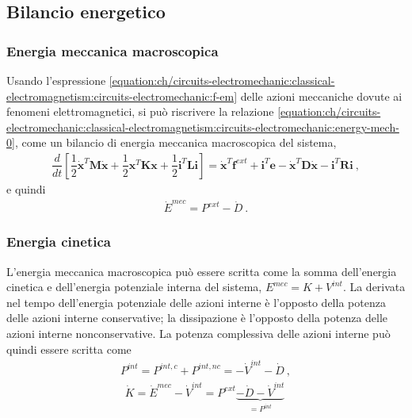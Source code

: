 \documentclass[letterpaper,10pt,english]{jupyterBook}
\begin{document}
\subsection{Bilancio energetico}
\label{\detokenize{ch/circuits-electromechanic:bilancio-energetico}}

\subsubsection{Energia meccanica macroscopica}
\label{\detokenize{ch/circuits-electromechanic:energia-meccanica-macroscopica}}
\sphinxAtStartPar
Usando l’espressione \eqref{equation:ch/circuits-electromechanic:classical-electromagnetism:circuits-electromechanic:f-em} delle azioni meccaniche dovute ai fenomeni elettromagnetici, si può riscrivere la relazione \eqref{equation:ch/circuits-electromechanic:classical-electromagnetism:circuits-electromechanic:energy-mech-0}, come un bilancio di energia meccanica macroscopica del sistema,
\begin{equation*}
\begin{split}\dfrac{d}{dt} \left[ \dfrac{1}{2} \dot{\mathbf{x}}^T \mathbf{M} \dot{\mathbf{x}} + \dfrac{1}{2} \mathbf{x}^T \mathbf{K} \mathbf{x} + \dfrac{1}{2} \mathbf{i}^T \mathbf{L} \mathbf{i} \right] = \dot{\mathbf{x}}^T \mathbf{f}^{ext} + \mathbf{i}^T \mathbf{e} - \dot{\mathbf{x}}^T \mathbf{D} \dot{\mathbf{x}} - \mathbf{i}^T \mathbf{R} \mathbf{i} \ , \end{split}
\end{equation*}
\sphinxAtStartPar
e quindi
\begin{equation*}
\begin{split}\dot{E}^{mec} = P^{ext} - \dot{D} \ .\end{split}
\end{equation*}

\subsubsection{Energia cinetica}
\label{\detokenize{ch/circuits-electromechanic:energia-cinetica}}
\sphinxAtStartPar
L’energia meccanica macroscopica può essere scritta come la somma dell’energia cinetica e dell’energia potenziale interna del sistema, \(E^{mec} = K + V^{int}\). La derivata nel tempo dell’energia potenziale delle azioni interne è l’opposto della potenza delle azioni interne conservative; la dissipazione è l’opposto della potenza delle azioni interne non\sphinxhyphen{}conservative. La potenza complessiva delle azioni interne può quindi essere scritta come
\begin{equation*}
\begin{split}P^{int} = P^{int, c} + P^{int, nc} = - \dot{V}^{int} - \dot{D} \ ,\end{split}
\end{equation*}\begin{equation*}
\begin{split}\dot{K} = \dot{E}^{mec} - \dot{V}^{int} = P^{ext} \underbrace{- \dot{D} - \dot{V}^{int}}_{=P^{int}} \  \end{split}
\end{equation*}
\end{document}
